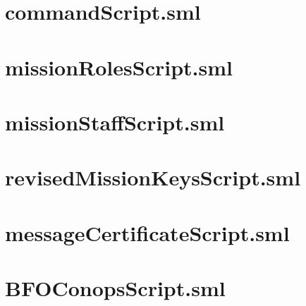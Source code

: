 \documentclass[10pt,twoside]{article}
\begin{document}
\begin{scriptsize}
  \begin{alltt}

  \end{alltt}
\end{scriptsize}

\section{commandScript.sml}
\begin{scriptsize}
  \begin{alltt}

  \end{alltt}
\end{scriptsize}

\section{missionRolesScript.sml}
\label{sec:missionRolesScript}

\begin{scriptsize}
  \begin{alltt}

  \end{alltt}
\end{scriptsize}

\section{missionStaffScript.sml}
\label{sec:missionStaffScript}

\begin{scriptsize}
  \begin{alltt}

  \end{alltt}
\end{scriptsize}

\section{revisedMissionKeysScript.sml}
\label{sec:revisedMissionKeysScript}

\begin{scriptsize}
  \begin{alltt}

  \end{alltt}
\end{scriptsize}

\section{messageCertificateScript.sml}
\label{sec:messageCertificateScript}

\begin{scriptsize}
  \begin{alltt}

  \end{alltt}
\end{scriptsize}

\section{BFOConopsScript.sml}
\label{sec:BFOConopsScript}

\begin{scriptsize}
  \begin{alltt}

  \end{alltt}
\end{scriptsize}
\end{document}
